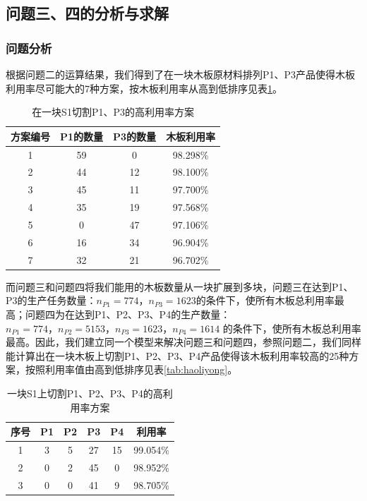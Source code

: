 \documentclass[hyperref,UTF8]{article}
\begin{document}
{\subsection{问题三、四的分析与求解}
\subsubsection{问题分析}
根据问题二的运算结果，我们得到了在一块木板原材料排列P1、P3产品使得木板利用率尽可能大的7种方案，按木板利用率从高到低排序见表\ref{tab:gaoliyonglv}。\par
\begin{table}[htbp]
  \centering
  \caption{在一块S1切割P1、P3的高利用率方案}
    \begin{tabular}{|c|c|c|c|}
    \hline
    方案编号 &P1的数量&P3的数量&木板利用率\\\hline
    1 & 59 & 0 & 98.298\% \\\hline
    2 & 44 & 12 & 98.100\% \\\hline
    3 & 45 & 11 & 97.700\% \\\hline
    4 & 35 & 19 & 97.568\% \\\hline
    5 & 0 & 47 & 97.106\% \\\hline
    6 & 16 & 34 & 96.904\% \\\hline
    7 & 32 & 21 & 96.702\% \\\hline
    \end{tabular}%
  \label{tab:gaoliyonglv}%
\end{table}%
而问题三和问题四将我们能用的木板数量从一块扩展到多块，问题三在达到P1、P3的生产任务数量：$n_{P1}=774\mbox{，}n_{P3}=1623$的条件下，使所有木板总利用率最高；问题四为在达到P1、P2、P3、P4的生产数量：$n_{P1}=774\mbox{，} n_{P2}=5153\mbox{，}n_{P3}=1623\mbox{，}n_{P4}=1614$ 的条件下，使所有木板总利用率最高。因此，我们建立同一个模型来解决问题三和问题四，参照问题二，我们同样能计算出在一块木板上切割P1、P2、P3、P4产品使得该木板利用率较高的25种方案，按照利用率值由高到低排序见表\ref{tab:haoliyong}。\par
\begin{table}[htbp]
  \centering
  \caption{一块S1上切割P1、P2、P3、P4的高利用率方案}
    \begin{tabular}{|c|c|c|c|c|c|}
    \hline
    序号 & P1 & P2 & P3 & P4 & 利用率 \\
    \hline
    1 & 3 & 5 & 27 & 15 & 99.054\% \\
    \hline
    2 & 0 & 2 & 45 & 0 & 98.952\% \\
    \hline
    3 & 0 & 0 & 41 & 9 & 98.705\% \\

\end{tabular}
\end{table}}
\end{document}

